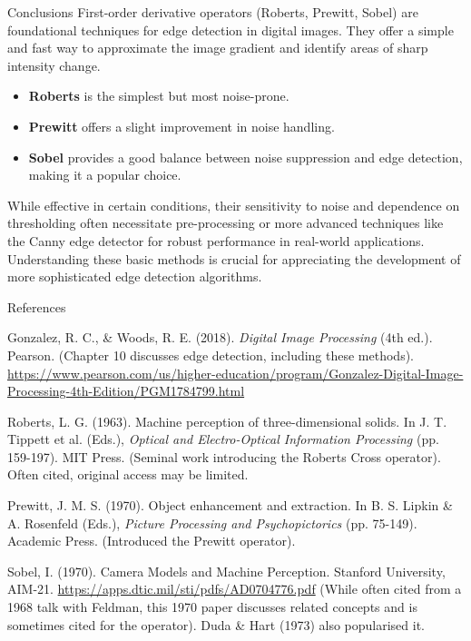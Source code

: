 \documentclass[final]{beamer}
\newlength{\colwidth}
\begin{document}
\begin{frame}[t]
\begin{columns}[t]
\begin{column}{\colwidth}
\begin{block}{Conclusions}
    First-order derivative operators (Roberts, Prewitt, Sobel) are foundational techniques for edge detection in digital images. They offer a simple and fast way to approximate the image gradient and identify areas of sharp intensity change.
    \begin{itemize}
        \item \textbf{Roberts} is the simplest but most noise-prone.
        \item \textbf{Prewitt} offers a slight improvement in noise handling.
        \item \textbf{Sobel} provides a good balance between noise suppression and edge detection, making it a popular choice.
    \end{itemize}
    While effective in certain conditions, their sensitivity to noise and dependence on thresholding often necessitate pre-processing or more advanced techniques like the Canny edge detector for robust performance in real-world applications. Understanding these basic methods is crucial for appreciating the development of more sophisticated edge detection algorithms.
  \end{block}

  \begin{block}{References}
    \begin{thebibliography}{9} 
        Gonzalez, R. C., \& Woods, R. E. (2018). \textit{Digital Image Processing} (4th ed.). Pearson.
        \newblock (Chapter 10 discusses edge detection, including these methods). \url{https://www.pearson.com/us/higher-education/program/Gonzalez-Digital-Image-Processing-4th-Edition/PGM1784799.html}

        Roberts, L. G. (1963). Machine perception of three-dimensional solids. In J. T. Tippett et al. (Eds.), \textit{Optical and Electro-Optical Information Processing} (pp. 159-197). MIT Press.
        \newblock (Seminal work introducing the Roberts Cross operator). Often cited, original access may be limited.

        Prewitt, J. M. S. (1970). Object enhancement and extraction. In B. S. Lipkin \& A. Rosenfeld (Eds.), \textit{Picture Processing and Psychopictorics} (pp. 75-149). Academic Press.
        \newblock (Introduced the Prewitt operator).

         Sobel, I. (1970). Camera Models and Machine Perception. Stanford University, AIM-21. \url{https://apps.dtic.mil/sti/pdfs/AD0704776.pdf} 
        \newblock (While often cited from a 1968 talk with Feldman, this 1970 paper discusses related concepts and is sometimes cited for the operator). Duda \& Hart (1973) also popularised it.


\end{thebibliography}
\end{block}
\end{column}
\end{columns}
\end{frame}
\end{document}
